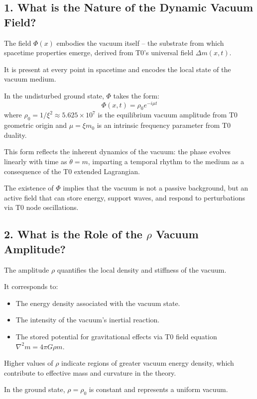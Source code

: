 	\subsection{1. What is the Nature of the Dynamic Vacuum Field?}
	
	The field $\Phi(x)$ embodies the vacuum itself – the substrate from which spacetime properties emerge, derived from T0's universal field $\Delta m(x,t)$.
	
	It is present at every point in spacetime and encodes the local state of the vacuum medium.
	
	In the undisturbed ground state, $\Phi$ takes the form:
	\[
	\Phi(x, t)= \rho_0 e^{-i\mu t}
	\]
	where $\rho_0 = 1/\xi^2 \approx 5.625 \times 10^7$ is the equilibrium vacuum amplitude from T0 geometric origin and $\mu = \xi m_0$ is an intrinsic frequency parameter from T0 duality.
	
	This form reflects the inherent dynamics of the vacuum: the phase evolves linearly with time as $\dot{\theta} = m$, imparting a temporal rhythm to the medium as a consequence of the T0 extended Lagrangian.
	
	The existence of $\Phi$ implies that the vacuum is not a passive background, but an active field that can store energy, support waves, and respond to perturbations via T0 node oscillations.
	
	\subsection{2. What is the Role of the $\rho$ Vacuum Amplitude?}
	
	The amplitude $\rho$ quantifies the local density and stiffness of the vacuum.
	
	It corresponds to:
	\begin{itemize}
		\item The energy density associated with the vacuum state.
		\item The intensity of the vacuum's inertial reaction.
		\item The stored potential for gravitational effects via T0 field equation $\nabla^2 m = 4\pi G \rho m$.
	\end{itemize}
	
	Higher values of $\rho$ indicate regions of greater vacuum energy density, which contribute to effective mass and curvature in the theory.
	
	In the ground state, $\rho = \rho_0$ is constant and represents a uniform vacuum.
	
